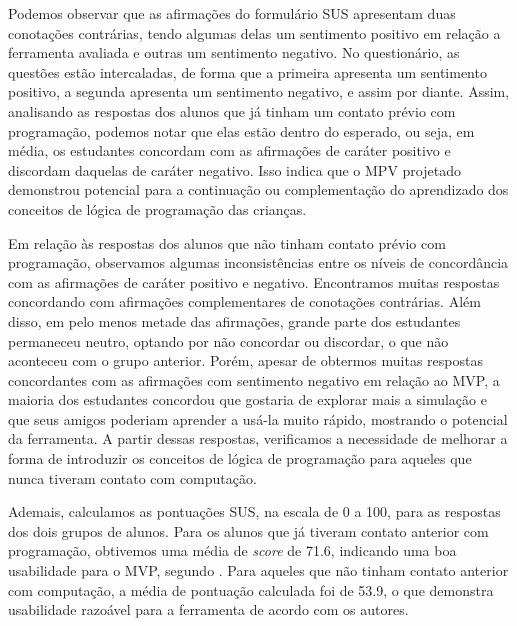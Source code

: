 Podemos observar que as afirmações do formulário SUS apresentam duas conotações contrárias, tendo algumas delas um sentimento positivo em relação a ferramenta avaliada e outras um sentimento negativo. No questionário, as questões estão intercaladas, de forma que a primeira apresenta um sentimento positivo, a segunda apresenta um sentimento negativo, e assim por diante. Assim, analisando as respostas dos alunos que já tinham um contato prévio com programação, podemos notar que elas estão dentro do esperado, ou seja, em média, os estudantes concordam com as afirmações de caráter positivo e discordam daquelas de caráter negativo. Isso indica que o MPV projetado demonstrou potencial para a continuação ou complementação do aprendizado dos conceitos de lógica de programação das crianças.

Em relação às respostas dos alunos que não tinham contato prévio com programação, observamos algumas inconsistências entre os níveis de concordância com as afirmações de caráter positivo e negativo. Encontramos muitas respostas concordando com afirmações complementares de conotações contrárias. Além disso, em pelo menos metade das afirmações, grande parte dos estudantes permaneceu neutro, optando por não concordar ou discordar, o que não aconteceu com o grupo anterior. Porém, apesar de obtermos muitas respostas concordantes com as afirmações com sentimento negativo em relação ao MVP, a maioria dos estudantes concordou que gostaria de explorar mais a simulação e que seus amigos poderiam aprender a usá-la muito rápido, mostrando o potencial da ferramenta. A partir dessas respostas, verificamos a necessidade de melhorar a forma de introduzir os conceitos de lógica de programação para aqueles que nunca tiveram contato com computação.

Ademais, calculamos as pontuações SUS, na escala de 0 a 100, para as respostas dos dois grupos de alunos. Para os alunos que já tiveram contato anterior com programação, obtivemos uma média de \textit{score} de 71.6, indicando uma boa usabilidade para o MVP, segundo \citet{bangor2009determining}. Para aqueles que não tinham contato anterior com computação, a média de pontuação calculada foi de 53.9, o que demonstra usabilidade razoável para a ferramenta de acordo com os autores.

